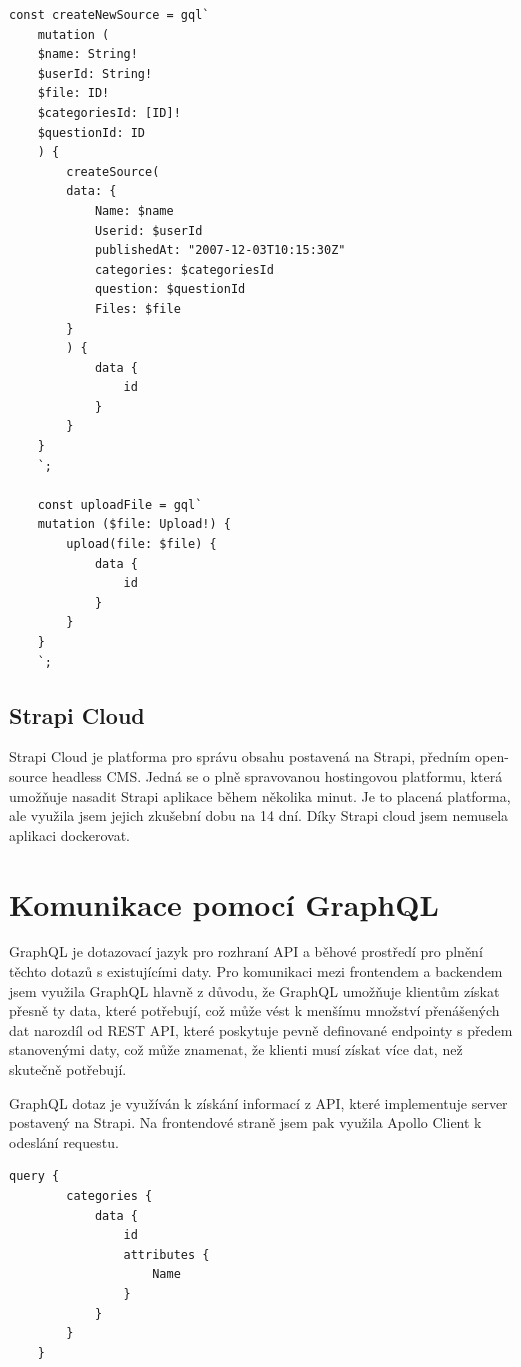 \documentclass[12pt, a4paper,
oneside,      %
openright
]{report}
\begin{document}
\vspace{10pt}

\begin{lstlisting}[style=JavaScript, title={Kód}, caption={Ukázka mutace v Content.js}] 
	const createNewSource = gql`
	mutation (
	$name: String!
	$userId: String!
	$file: ID!
	$categoriesId: [ID]!
	$questionId: ID
	) {
		createSource(
		data: {
			Name: $name
			Userid: $userId
			publishedAt: "2007-12-03T10:15:30Z"
			categories: $categoriesId
			question: $questionId
			Files: $file
		}
		) {
			data {
				id
			}
		}
	}
	`;
	
	const uploadFile = gql`
	mutation ($file: Upload!) {
		upload(file: $file) {
			data {
				id
			}
		}
	}
	`;
\end{lstlisting}

\subsection{Strapi Cloud}
Strapi Cloud je platforma pro správu obsahu postavená na Strapi, předním open-source headless CMS. Jedná se o plně spravovanou hostingovou platformu, která umožňuje nasadit Strapi aplikace během několika minut. Je to placená platforma, ale využila jsem jejich zkušební dobu na 14 dní. Díky Strapi cloud jsem nemusela aplikaci dockerovat.

\section{Komunikace pomocí GraphQL}
GraphQL je dotazovací jazyk pro rozhraní API a běhové prostředí pro plnění těchto dotazů s existujícími daty. Pro komunikaci mezi frontendem a backendem jsem využila GraphQL hlavně z důvodu, že GraphQL umožňuje klientům získat přesně ty data, které potřebují, což může vést k menšímu množství přenášených dat narozdíl od REST API, které poskytuje pevně definované endpointy s předem stanovenými daty, což může znamenat, že klienti musí získat více dat, než skutečně potřebují.

GraphQL dotaz je využíván k získání informací z API, které implementuje server postavený na Strapi. Na frontendové straně jsem pak využila Apollo Client k odeslání requestu.

\vspace{10pt}

\begin{lstlisting}[style=JavaScript, title={Kód}, caption={Ukázka query v Content.js}] 
	query {
		categories {
			data {
				id
				attributes {
					Name
				}
			}
		}
	}
\end{lstlisting}
\end{document}
